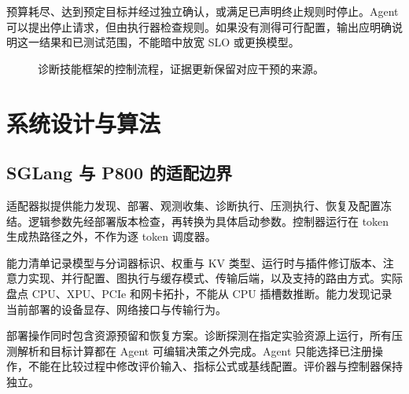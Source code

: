 \documentclass[UTF8,11pt,a4paper,fontset=windows]{ctexart}
\begin{document}
预算耗尽、达到预定目标并经过独立确认，或满足已声明终止规则时停止。Agent 可以提出停止请求，但由执行器检查规则。如果没有测得可行配置，输出应明确说明这一结果和已测试范围，不能暗中放宽 SLO 或更换模型。

\begin{figure}[t]
\centering
{}
\caption{诊断技能框架的控制流程，证据更新保留对应干预的来源。}
\label{fig:architecture}
\end{figure}

\section{系统设计与算法}
\subsection{SGLang 与 P800 的适配边界}
适配器拟提供能力发现、部署、观测收集、诊断执行、压测执行、恢复及配置冻结。逻辑参数先经部署版本检查，再转换为具体启动参数。控制器运行在 token 生成热路径之外，不作为逐 token 调度器。

能力清单记录模型与分词器标识、权重与 KV 类型、运行时与插件修订版本、注意力实现、并行配置、图执行与缓存模式、传输后端，以及支持的路由方式。实际盘点 CPU、XPU、PCIe 和网卡拓扑，不能从 CPU 插槽数推断。能力发现记录当前部署的设备显存、网络接口与传输行为。

部署操作同时包含资源预留和恢复方案。诊断探测在指定实验资源上运行，所有压测解析和目标计算都在 Agent 可编辑决策之外完成。Agent 只能选择已注册操作，不能在比较过程中修改评价输入、指标公式或基线配置。评价器与控制器保持独立。
\end{document}
